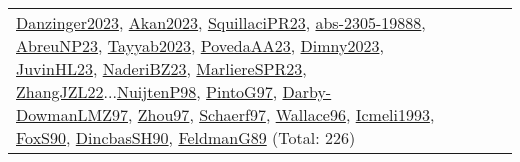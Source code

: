 {\begin{longtable}{p{3cm}r>{\raggedright\arraybackslash}p{6cm}>{\raggedright\arraybackslash}p{6cm}>{\raggedright\arraybackslash}p{8cm}}
\hyperref[detail:Danzinger2023]{Danzinger2023}, \hyperref[detail:Akan2023]{Akan2023}, \hyperref[detail:SquillaciPR23]{SquillaciPR23}, \hyperref[detail:abs-2305-19888]{abs-2305-19888}, \hyperref[detail:AbreuNP23]{AbreuNP23}, \hyperref[detail:Tayyab2023]{Tayyab2023}, \hyperref[detail:PovedaAA23]{PovedaAA23}, \hyperref[detail:Dimny2023]{Dimny2023}, \hyperref[detail:JuvinHL23]{JuvinHL23}, \hyperref[detail:NaderiBZ23]{NaderiBZ23}, \hyperref[detail:MarliereSPR23]{MarliereSPR23}, \hyperref[detail:ZhangJZL22]{ZhangJZL22}...\hyperref[detail:NuijtenP98]{NuijtenP98}, \hyperref[detail:PintoG97]{PintoG97}, \hyperref[detail:Darby-DowmanLMZ97]{Darby-DowmanLMZ97}, \hyperref[detail:Zhou97]{Zhou97}, \hyperref[detail:Schaerf97]{Schaerf97}, \hyperref[detail:Wallace96]{Wallace96}, \hyperref[detail:Icmeli1993]{Icmeli1993}, \hyperref[detail:FoxS90]{FoxS90}, \hyperref[detail:DincbasSH90]{DincbasSH90}, \hyperref[detail:FeldmanG89]{FeldmanG89} (Total: 226)\\

\end{longtable}}
